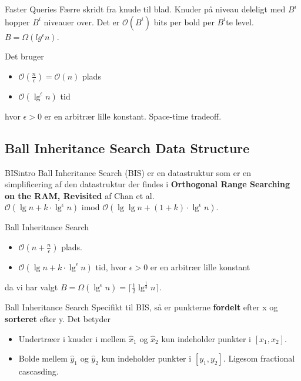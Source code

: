 \documentclass[pdf]{beamer}
\begin{document}
\begin{frame}{Faster Queries}
  Færre skridt fra knude til blad. Knuder på niveau deleligt med $B^i$ hopper $B^i$ niveauer over. Det er $\mathcal{O}(B^i)$ bits per bold per $B^i$te level. $B = \Omega(lg^\epsilon n)$.

  Det bruger
  \begin{itemize}
    \item $\mathcal{O}(\frac{n}{\epsilon}) = \mathcal{O}(n)$ plads
    \item $\mathcal{O}(\lg^\epsilon n)$ tid
  \end{itemize}
  hvor $\epsilon > 0$ er en arbitrær lille konstant. Space-time tradeoff.\\

\end{frame}

\subsection{Ball Inheritance Search Data Structure}

\begin{frame}{BISintro}
  Ball Inheritance Search (BIS) er en datastruktur som er en simplificering af den datastruktur der findes i \textbf{Orthogonal Range Searching on the RAM, Revisited}\cite{chanetal} af Chan et al.\\

  $\mathcal{O}(\lg n + k\cdot\lg^\epsilon n)$ imod $\mathcal{O}(\lg \lg n + (1+k)\cdot\lg^\epsilon n)$.

\end{frame}


\begin{frame}{Ball Inheritance Search}

  \begin{itemize}
    \item $\mathcal{O}(n + \frac{n}{\epsilon})$ plads.
    \item $\mathcal{O}(\lg n + k\cdot\lg^\epsilon n)$ tid, hvor $\epsilon > 0$ er en arbitrær lille konstant
  \end{itemize}
    da vi har valgt $B = \Omega(\lg^\epsilon n) = \lceil \frac{1}{2}\lg^\frac{1}{3} n \rceil$.
\end{frame}


\begin{frame}{Ball Inheritance Search}
  Specifikt til BIS, så er punkterne \textbf{fordelt} efter x og \textbf{sorteret} efter y. Det betyder
  \begin{itemize}
    \item Undertræer i knuder i mellem $\hat{x}_1$ og $\hat{x}_2$ kun indeholder punkter i $[x_1, x_2]$.
    \item Bolde mellem $\hat{y}_1$ og $\hat{y}_2$ kun indeholder punkter i $[y_1, y_2]$.  Ligesom fractional cascasding.

  \end{itemize}
\end{frame}
\end{document}
